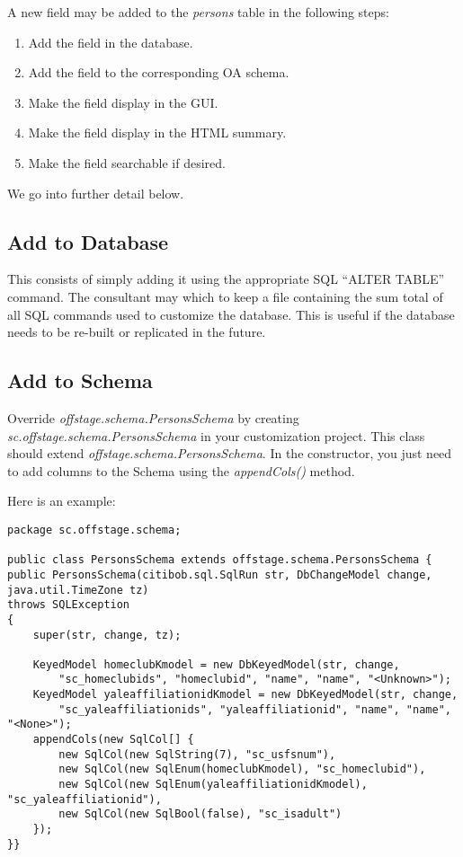 \documentclass[11pt]{article}
\begin{document}
A new field may be added to the \emph{persons} table in the following steps:
 \begin{enumerate}
 \item Add the field in the database.
 \item Add the field to the corresponding OA schema.
 \item Make the field display in the GUI.
 \item Make the field display in the HTML summary.
 \item Make the field searchable if desired.
 \end{enumerate}

We go into further detail below.

\subsection{Add to Database}

This consists of simply adding it using the appropriate SQL ``ALTER TABLE'' command.  The consultant may which to keep a file containing the sum total of all SQL commands used to customize the database.  This is useful if the database needs to be re-built or replicated in the future.

\subsection{Add to Schema}

Override \emph{offstage.schema.PersonsSchema} by creating \emph{sc.offstage.schema.PersonsSchema} in your customization project.  This class should extend \emph{offstage.schema.PersonsSchema}.  In the constructor, you just need to add columns to the Schema using the \emph{appendCols()} method.

Here is an example:
\begin{verbatim}
package sc.offstage.schema;

public class PersonsSchema extends offstage.schema.PersonsSchema {
public PersonsSchema(citibob.sql.SqlRun str, DbChangeModel change, java.util.TimeZone tz)
throws SQLException
{
    super(str, change, tz);
    
    KeyedModel homeclubKmodel = new DbKeyedModel(str, change,
        "sc_homeclubids", "homeclubid", "name", "name", "<Unknown>");
    KeyedModel yaleaffiliationidKmodel = new DbKeyedModel(str, change,
        "sc_yaleaffiliationids", "yaleaffiliationid", "name", "name", "<None>");
    appendCols(new SqlCol[] {
        new SqlCol(new SqlString(7), "sc_usfsnum"),
        new SqlCol(new SqlEnum(homeclubKmodel), "sc_homeclubid"),
        new SqlCol(new SqlEnum(yaleaffiliationidKmodel), "sc_yaleaffiliationid"),
        new SqlCol(new SqlBool(false), "sc_isadult")
    });
}}
\end{verbatim}
\end{document}
